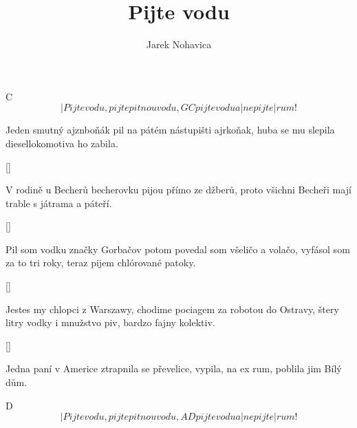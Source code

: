\documentclass{song}
\title{Pijte vodu}
\author{Jarek Nohavica}
\begin{document}
   C
\[ |Pijte vodu, pijte pitnou vodu,
             G        C
pijte vodu a |nepijte |rum! \]
\endstrophe

\strophe*
Jeden smutný ajznboňák
pil na pátém nástupišti ajrkoňak,
huba se mu slepila
diesellokomotiva ho zabila.
\endstrophe

\ref{}

\strophe*
V rodině u Becherů
becherovku pijou přímo ze džberů,
proto všichni Becheři
mají trable s játrama a páteří.
\endstrophe

\ref{}

\strophe*
Pil som vodku značky Gorbačov
potom povedal som všeličo a volačo,
vyfásol som za to tri roky,
teraz pijem chlórované patoky.
\endstrophe

\ref{}

\strophe*
Jestes my chlopci z Warszawy,
chodime pociagem za robotou do Ostravy,
štery litry vodky i mnužstvo piv,
bardzo fajny kolektiv.
\endstrophe

\ref{}

\strophe*
Jedna paní v Americe
ztrapnila se převelice,
vypila, na ex rum,
poblila jim Bílý dům.
\endstrophe

   D
\[ |Pijte vodu, pijte pitnou vodu,
             A        D
pijte vodu a |nepijte |rum! \]
\endstrophe
\end{document}
